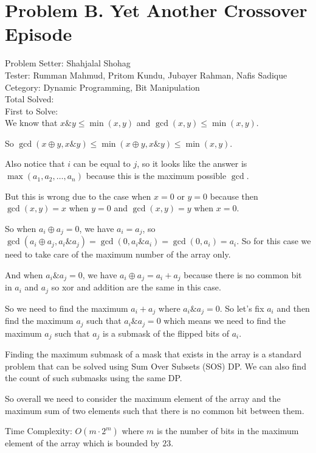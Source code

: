\section*{Problem B. Yet Another Crossover Episode}

Problem Setter: Shahjalal Shohag \\
Tester: Rumman Mahmud, Pritom Kundu, Jubayer Rahman, Nafis Sadique \\
Cetegory: Dynamic Programming, Bit Manipulation \\
Total Solved:  \\
First to Solve: \\

We know that $x \& y \le \min(x, y)$ and $\gcd(x, y) \le \min(x, y)$.

So $\gcd(x \oplus y, x \& y) \le \min(x \oplus y, x \& y) \le \min(x, y)$.

Also notice that $i$ can be equal to $j$, so it looks like the answer is $\max({a_1, a_2, \ldots, a_n})$ because this is the maximum possible $\gcd$.

But this is wrong due to the case when $x = 0$ or $y = 0$ because then $\gcd(x, y) = x$ when $y = 0$ and $\gcd(x, y) = y$ when $x = 0$.

So when $a_i \oplus a_j = 0$, we have $a_i = a_j$, so $\gcd(a_i \oplus a_j, a_i \& a_j) = \gcd(0, a_i \& a_i) = \gcd(0, a_i) = a_i$.
So for this case we need to take care of the maximum number of the array only.

And when $a_i \& a_j = 0$, we have $a_i \oplus a_j = a_i + a_j$ because there is no common bit in $a_i$ and $a_j$
so xor and addition are the same in this case.

So we need to find the maximum $a_i + a_j$ where $a_i \& a_j = 0$. So let's fix $a_i$
and then find the maximum $a_j$ such that $a_i \& a_j = 0$ which means we 
need to find the maximum $a_j$ such that $a_j$ is a submask of the flipped bits of $a_i$.

Finding the maximum submask of a mask that exists in the array is a standard problem that can be solved
using Sum Over Subsets (SOS) DP. We can also find the count of such submasks using the same DP.

So overall we need to consider the maximum element of the array and the maximum sum of two elements such that there is no common bit between them.

Time Complexity: $O(m \cdot 2^m)$ where $m$ is the number of bits in the maximum element of the array which is bounded by $23$.